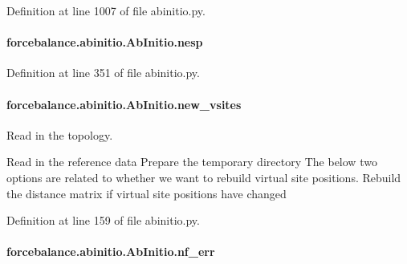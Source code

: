 Definition at line 1007 of file abinitio.\-py.

\hypertarget{classforcebalance_1_1abinitio_1_1AbInitio_ac258ad6180275ba2ffe5f68d1217e4ac}{
\paragraph[{nesp}]{\setlength{\rightskip}{0pt plus 5cm}forcebalance.\-abinitio.\-Ab\-Initio.\-nesp\hspace{0.3cm}{\ttfamily [inherited]}}}\label{classforcebalance_1_1abinitio_1_1AbInitio_ac258ad6180275ba2ffe5f68d1217e4ac}


Definition at line 351 of file abinitio.\-py.

\hypertarget{classforcebalance_1_1abinitio_1_1AbInitio_a64f1aeadac4d7b09424c20b83e5ad5af}{
\paragraph[{new\-\_\-vsites}]{\setlength{\rightskip}{0pt plus 5cm}forcebalance.\-abinitio.\-Ab\-Initio.\-new\-\_\-vsites\hspace{0.3cm}{\ttfamily [inherited]}}}\label{classforcebalance_1_1abinitio_1_1AbInitio_a64f1aeadac4d7b09424c20b83e5ad5af}


Read in the topology. 

Read in the reference data Prepare the temporary directory The below two options are related to whether we want to rebuild virtual site positions. Rebuild the distance matrix if virtual site positions have changed 

Definition at line 159 of file abinitio.\-py.

\hypertarget{classforcebalance_1_1abinitio_1_1AbInitio_a89de620e9aa500481c9e1ded99e14f72}{
\paragraph[{nf\-\_\-err}]{\setlength{\rightskip}{0pt plus 5cm}forcebalance.\-abinitio.\-Ab\-Initio.\-nf\-\_\-err\hspace{0.3cm}{\ttfamily [inherited]}}}\label{classforcebalance_1_1abinitio_1_1AbInitio_a89de620e9aa500481c9e1ded99e14f72}


